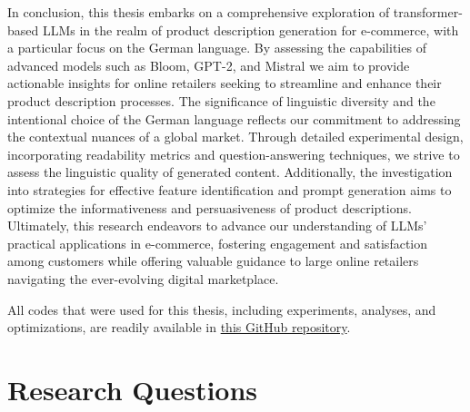 In conclusion, this thesis embarks on a comprehensive exploration of transformer-based LLMs in the realm of product description generation for e-commerce, with a particular focus on the German language. By assessing the capabilities of advanced models such as Bloom, GPT-2, and Mistral we aim to provide actionable insights for online retailers seeking to streamline and enhance their product description processes. The significance of linguistic diversity and the intentional choice of the German language reflects our commitment to addressing the contextual nuances of a global market. Through detailed experimental design, incorporating readability metrics and question-answering techniques, we strive to assess the linguistic quality of generated content. Additionally, the investigation into strategies for effective feature identification and prompt generation aims to optimize the informativeness and persuasiveness of product descriptions. Ultimately, this research endeavors to advance our understanding of LLMs' practical applications in e-commerce, fostering engagement and satisfaction among customers while offering valuable guidance to large online retailers navigating the ever-evolving digital marketplace.

All codes that were used for this thesis, including experiments, analyses, and optimizations, are readily available in \href{https://github.com/neginsh/LLMs-for-product-description-generation}{this GitHub repository}.




\section{Research Questions}

